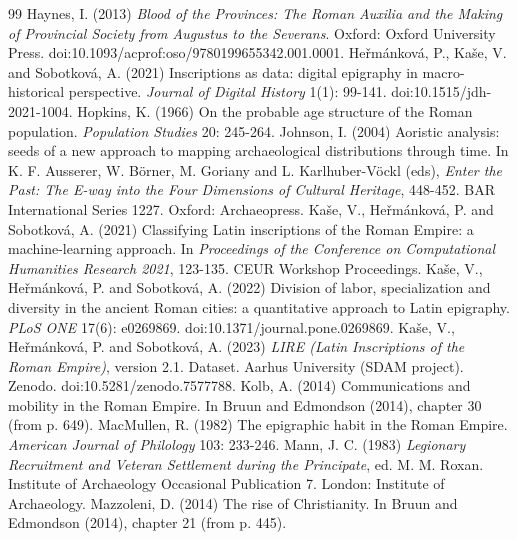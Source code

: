 \begin{thebibliography}{99}
 Haynes, I. (2013) \textit{Blood of the Provinces: The Roman Auxilia and the Making of Provincial Society from Augustus to the Severans}. Oxford: Oxford University Press. doi:10.1093/acprof:oso/9780199655342.001.0001.
 He{\v r}m{\'a}nkov{\'a}, P., Ka{\v s}e, V. and Sobotkov{\'a}, A. (2021) Inscriptions as data: digital epigraphy in macro-historical perspective. \textit{Journal of Digital History} 1(1): 99-141. doi:10.1515/jdh-2021-1004.
 Hopkins, K. (1966) On the probable age structure of the Roman population. \textit{Population Studies} 20: 245-264.
 Johnson, I. (2004) Aoristic analysis: seeds of a new approach to mapping archaeological distributions through time. In K. F. Ausserer, W. B{\"o}rner, M. Goriany and L. Karlhuber-V{\"o}ckl (eds), \textit{Enter the Past: The E-way into the Four Dimensions of Cultural Heritage}, 448-452. BAR International Series 1227. Oxford: Archaeopress.
 Ka{\v s}e, V., He{\v r}m{\'a}nkov{\'a}, P. and Sobotkov{\'a}, A. (2021) Classifying Latin inscriptions of the Roman Empire: a machine-learning approach. In \textit{Proceedings of the Conference on Computational Humanities Research 2021}, 123-135. CEUR Workshop Proceedings.
 Ka{\v s}e, V., He{\v r}m{\'a}nkov{\'a}, P. and Sobotkov{\'a}, A. (2022) Division of labor, specialization and diversity in the ancient Roman cities: a quantitative approach to Latin epigraphy. \textit{PLoS ONE} 17(6): e0269869. doi:10.1371/journal.pone.0269869.
 Ka{\v s}e, V., He{\v r}m{\'a}nkov{\'a}, P. and Sobotkov{\'a}, A. (2023) \textit{LIRE (Latin Inscriptions of the Roman Empire)}, version 2.1. Dataset. Aarhus University (SDAM project). Zenodo. doi:10.5281/zenodo.7577788.
 Kolb, A. (2014) Communications and mobility in the Roman Empire. In Bruun and Edmondson (2014), chapter 30 (from p. 649).
 MacMullen, R. (1982) The epigraphic habit in the Roman Empire. \textit{American Journal of Philology} 103: 233-246.
 Mann, J. C. (1983) \textit{Legionary Recruitment and Veteran Settlement during the Principate}, ed. M. M. Roxan. Institute of Archaeology Occasional Publication 7. London: Institute of Archaeology.
 Mazzoleni, D. (2014) The rise of Christianity. In Bruun and Edmondson (2014), chapter 21 (from p. 445).

\end{thebibliography}
